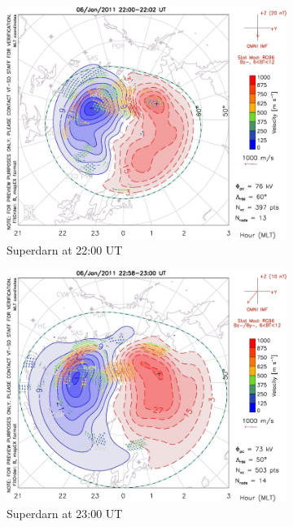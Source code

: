 \documentclass[10pt,a4paper]{article}
\begin{document}
\begin{figure}
\begin{subfigure}{0.3\textwidth}
\centering
	\includegraphics[width=\textwidth]{Superdarn5.jpg}
	\caption{ Superdarn at 22:00 UT \label{Super_22}}
\end{subfigure}
\begin{subfigure}{0.3\textwidth}
\centering
	\includegraphics[width=\textwidth]{Superdarn6.jpg}
	\caption{ Superdarn at 23:00 UT \label{Super_23}}
\end{subfigure}
\begin{subfigure}{0.3\textwidth}
\centering

\end{subfigure}
\end{figure}
\end{document}

